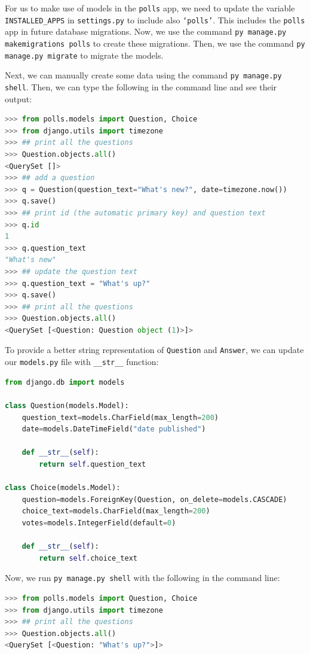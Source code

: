 \documentclass[a4paper, openany]{memoir}
\begin{document}
    For us to make use of models in the \texttt{polls} app, we need to update the variable \texttt{INSTALLED\_APPS} in \texttt{settings.py} to include also \texttt{`polls'}. This includes the \texttt{polls} app in future database migrations. Now, we use the command \texttt{py manage.py makemigrations polls} to create these migrations. Then, we use the command \texttt{py manage.py migrate} to migrate the models.

    Next, we can manually create some data using the command \texttt{py manage.py shell}. Then, we can type the following in the command line and see their output:
\begin{lstlisting}[language=python]
>>> from polls.models import Question, Choice
>>> from django.utils import timezone
>>> ## print all the questions
>>> Question.objects.all()
<QuerySet []>
>>> ## add a question
>>> q = Question(question_text="What's new?", date=timezone.now())
>>> q.save()
>>> ## print id (the automatic primary key) and question text
>>> q.id
1
>>> q.question_text
"What's new"
>>> ## update the question text
>>> q.question_text = "What's up?"
>>> q.save()
>>> ## print all the questions
>>> Question.objects.all()
<QuerySet [<Question: Question object (1)>]>
\end{lstlisting}
    To provide a better string representation of \texttt{Question} and \texttt{Answer}, we can update our \texttt{models.py} file with \texttt{\_\_str\_\_} function:
\begin{lstlisting}[language=python]
from django.db import models

class Question(models.Model):
    question_text=models.CharField(max_length=200)
    date=models.DateTimeField("date published")
    
    def __str__(self):
        return self.question_text

class Choice(models.Model):
    question=models.ForeignKey(Question, on_delete=models.CASCADE)
    choice_text=models.CharField(max_length=200)
    votes=models.IntegerField(default=0)
    
    def __str__(self):
        return self.choice_text
\end{lstlisting}
    Now, we run \texttt{py manage.py shell} with the following in the command line:
\begin{lstlisting}[language=python]
>>> from polls.models import Question, Choice
>>> from django.utils import timezone
>>> ## print all the questions
>>> Question.objects.all()
<QuerySet [<Question: "What's up?">]>
\end{lstlisting}
\end{document}
